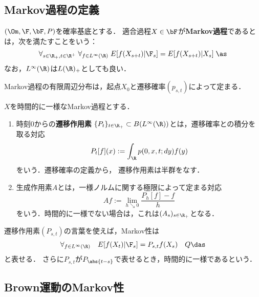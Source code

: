 \documentclass[uplatex,dvipdfmx]{jsreport}
\begin{document}
\subsection{Markov過程の定義}

\begin{definition}
    $(\Om,\F,\bF,P)$を確率基底とする．
    適合過程$X\in\bF$が\textbf{Markov過程}であるとは，次を満たすことをいう：
    \[\forall_{s\in\R_+,t\in\R^+}\;\forall_{f\in L^\infty(\R)}\;E[f(X_{s+t})|\F_s]=E[f(X_{s+t})|X_s]\;\as\]
    なお，$L^\infty(\R)$は$L(\R)_+$としても良い．
\end{definition}
\begin{remarks}[Markov過程の特徴付け]
    Markov過程の有限周辺分布は，起点$X_0$と遷移確率$(p_{s,t})$によって定まる．
\end{remarks}

\begin{definition}
    $X$を時間的に一様なMarkov過程とする．
    \begin{enumerate}
        \item 時刻$0$からの\textbf{遷移作用素}
        $\{P_t\}_{t\in\R_+}\subset B(L^\infty(\R))$とは，遷移確率との積分を取る対応
        \[P_t[f](x):=\int_\R p(0,x,t;dy)f(y)\]
        をいう．遷移確率の定義から，
        遷移作用素は半群をなす．
        \item 生成作用素$A$とは，一様ノルムに関する極限によって定まる対応
        \[Af:=\lim_{h\searrow0}\frac{P_{h}[f]-f}{h}\]
        をいう．時間的に一様でない場合は，これは$(A_s)_{s\in\R_+}$となる．
    \end{enumerate}
\end{definition}

\begin{remarks}
    遷移作用素$(P_{s,t})$の言葉を使えば，Markov性は
    \[\forall_{f\in L^\infty(\R)}\quad E[f(X_t)|\F_s]=P_{s,t}f(X_s)\quad Q\das\]
    と表せる．
    さらに$P_{s,t}$が$P_{\abs{t-s}}$で表せるとき，時間的に一様であるという．
\end{remarks}

\subsection{Brown運動のMarkov性}
\end{document}
